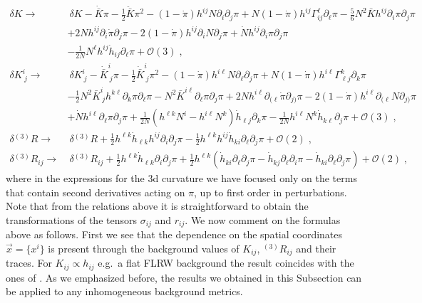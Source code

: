 \documentclass[a4paper,11pt]{article}
\numberwithin{equation}{section}
\begin{document}
\begin{align}
\delta K \rightarrow & \ \delta K - \dot{\bar{K}} \pi - \frac{1}{2} \ddot{\bar{K}} \pi^2 - (1 - \dot{\pi})h^{ij} N\partial_i\partial_j\pi + N(1 - \dot{\pi})h^{ij} \Gamma^\ell_{i j} \partial_\ell\pi  - \frac{5}{6}N^2 \bar{K}h^{ij}\partial_i\pi \partial_j \pi  \nonumber \\ &+ 2N h^{i j} \partial_{i} \dot{\pi} \partial_{j}\pi - 2(1 - \dot{\pi})h^{ij} \partial_{i} N \partial_{j}\pi + \dot{N} h^{i j} \partial_i \pi \partial_j \pi \nonumber \\ &- \frac{1}{2N} N^\ell h^{ij}  \dot{h}_{ij} \partial_\ell \pi + \mathcal{O}(3) \;, \\
\delta K_{\ j}^i \rightarrow  & \ \delta K^i_{\ j} - \dot{\bar{K}}^i_{\ j} \pi - \frac{1}{2} \dot{\bar{K}}^i_{\ j} \pi^2 - (1 - \dot{\pi})h^{i\ell} N\partial_\ell\partial_j\pi + N(1 - \dot{\pi})h^{i\ell} \Gamma^k_{\ell j} \partial_k\pi  \nonumber \\ & - \frac{1}{2}N^2 \bar{K}^i_{\ j} h^{k\ell}\partial_k\pi \partial_\ell \pi  - N^2 \bar{K}^{i\ell} \partial_\ell \pi \partial_j\pi + 2N h^{i \ell} \partial_{(\ell} \dot{\pi} \partial_{j)}\pi - 2(1 - \dot{\pi})h^{i\ell} \partial_{(\ell} N \partial_{j)}\pi \nonumber \\ &+ \dot{N} h^{i \ell} \partial_\ell \pi \partial_j \pi + \frac{1}{2N} (h^{\ell k} N^i - h^{i\ell} N^k) \dot{h}_{\ell j} \partial_k \pi - \frac{1}{2N} h^{i\ell} N^k \dot{h}_{k\ell} \partial_j\pi + \mathcal{O}(3) \;, \\
\delta {}^{(3)}\!R \rightarrow  & \ \delta {}^{(3)}\!R + \frac{1}{2}h^{\ell k}\dot{h}_{\ell k}h^{ij} \partial_i \partial_j \pi - \frac{1}{2}h^{\ell k}h^{ij}\dot{h}_{k i} \partial_\ell \partial_j \pi  + \mathcal{O}(2) \;, \\
\delta {}^{(3)}\!R_{ij} \rightarrow  & \ \delta {}^{(3)}\!R_{ij} + \frac{1}{2}h^{\ell k}\dot{h}_{\ell k} \partial_i \partial_j \pi + \frac{1}{2}h^{\ell k}(\dot{h}_{k i}\partial_\ell \partial_j \pi - \dot{h}_{kj} \partial_\ell \partial_i \pi - \dot{h}_{k i} \partial_\ell \partial_j \pi ) + \mathcal{O}(2) \;,
\end{align}
where in the expressions for the 3d curvature we have focused only on the terms that contain second derivatives acting on $\pi$, up to first order in perturbations. Note that from the relations above it is straightforward to obtain the transformations of the tensors $\sigma_{ij}$ and $r_{ij}$. We now comment on the formulas above as follows. First we see that the dependence on the spatial coordinates $\vec{x} = \{x^i\}$ is present through the background values of $K_{ij}$, ${}^{(3)}\!R_{ij}$ and their traces. For $K_{ij} \propto h_{ij}$ e.g.~a flat FLRW background the result coincides with the ones of \cite{Cusin:2017mzw}. As we emphasized before, the results we obtained in this Subsection can be applied to any inhomogeneous background metrics.
\end{document}
